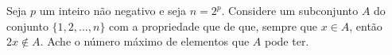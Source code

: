 Seja $p$ um inteiro não negativo e seja $n = 2^p$. Considere um subconjunto $A$ do conjunto $\{1,2,...,n\}$ com a propriedade que de que, sempre que $x \in A$, então $2x \not\in A$. Ache o número máximo de elementos que $A$ pode ter.
